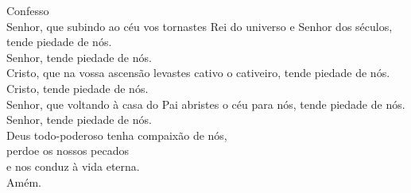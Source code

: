 \textcolor{VioletRed1}{Confesso}
\vspace{0.2cm} \\
\VbarRed{} Senhor, que subindo ao céu vos tornastes Rei do universo e Senhor dos séculos, tende piedade de nós.\\
\RbarRed{} Senhor, tende piedade de nós.
\vspace{0.1cm} \\
\VbarRed{} Cristo, que na vossa ascensão levastes cativo o cativeiro, tende piedade de nós.\\
\RbarRed{} Cristo, tende piedade de nós.
\vspace{0.1cm} \\
\VbarRed{} Senhor, que voltando à casa do Pai abristes o céu para nós, tende piedade de nós.\\
\RbarRed{} Senhor, tende piedade de nós.
\vspace{0.1cm} \\
Deus todo-poderoso tenha compaixão de nós, \\
perdoe os nossos pecados \\
e nos conduz à vida eterna. \\
\RbarRed{} Amém.
\vspace{0.2cm} \\
